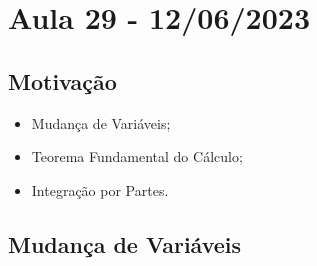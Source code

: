 \documentclass[Analysis/analysis_notes.tex]{subfiles}
\begin{document}
\section{Aula 29 - 12/06/2023}
\subsection{Motivação}
\begin{itemize}
	\item Mudança de Variáveis;
	\item Teorema Fundamental do Cálculo;
	\item Integração por Partes.
\end{itemize}
\subsection{Mudança de Variáveis}
\end{document}
